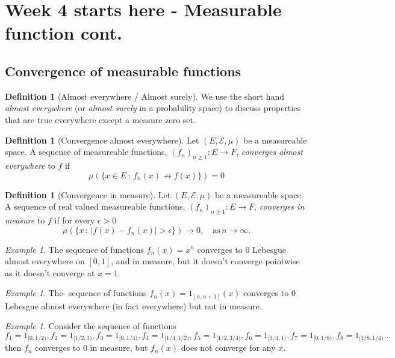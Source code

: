 \documentclass[11pt]{article}
\theoremstyle{definition}
\newtheorem{dfn}[thm]{Definition}
\theoremstyle{remark}
\newtheorem{ex}[thm]{Example}
\begin{document}
\section{Week 4 starts here - Measurable function cont.}
\subsection{Convergence of measurable functions}
\begin{dfn}[Almost everywhere / Almost surely]
We use the short hand \emph{almost everywhere} (or \emph{almost surely} in a probability space) to discuss properties that are true everywhere except a measure zero set. 
\end{dfn}

\begin{dfn}[Convergence almost everywhere] Let $(E, \mathcal{E}, \mu)$ be a measureable space. A sequence of measureable functions, $(f_n)_{n \geq 1}: E \rightarrow F$, \emph{converges almost everywhere} to $f$ if 
\[ \mu \left( \{ x \in E \,:\, f_n(x) \not\to f(x) \} \right) = 0 \]
\end{dfn}

\begin{dfn}[Convergence in measure]
Let $(E, \mathcal{E}, \mu)$ be a measureable space. A sequence of real valued measureable functions, $(f_n)_{n \geq 1}: E \rightarrow F$, \emph{converges in measure} to $f$ if for every $\epsilon > 0$
\[ \mu \left( \{ x \, :\, |f(x) - f_n(x)| > \epsilon \} \right) \rightarrow 0, \quad \mbox{as}\, n \rightarrow \infty. \]
\end{dfn}

\begin{ex}
The sequence of functions $f_n(x) = x^n$ converges to $0$ Lebesgue almost everywhere on $[0,1]$, and in measure, but it doesn't converge pointwise as it doesn't converge at $x=1$.
\end{ex}
\begin{ex}
The- sequence of functions $f_n(x) = 1_{[n,n+1]}(x)$ converges to 0 Lebesgue almost everywhere (in fact everywhere) but not in measure.
\end{ex}
\begin{ex}
Consider the sequence of functions $f_1 = 1_{[0,1/2)}, f_2 = 1_{[1/2, 1)}, f_3 = 1_{[0,1/4)}, f_4 = 1_{[1/4, 1/2)}, f_5= 1_{[1/2, 3/4)}, f_6 = 1_{[3/4,1)}, f_7 = 1_{[0,1/8)}, f_8 = 1_{[1/8, 1/4)} \dots$ then $f_n$ converges to 0 in measure, but $f_n(x)$ does not converge for any $x$. 
\end{ex}
\end{document}
